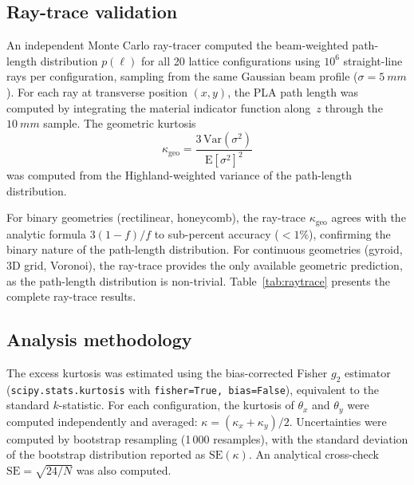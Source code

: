 \documentclass[final,5p,times,twocolumn]{elsarticle}
\begin{document}
\subsection{Ray-trace validation}
\label{sec:raytrace}

An independent Monte Carlo ray-tracer computed the beam-weighted path-length distribution $p(\ell)$ for all 20 lattice configurations using $10^6$ straight-line rays per configuration, sampling from the same Gaussian beam profile ($\sigma=\SI{5}{mm}$).  For each ray at transverse position $(x,y)$, the PLA path length was computed by integrating the material indicator function along~$z$ through the $\SI{10}{mm}$ sample.  The geometric kurtosis
\begin{equation}
  \kappa_{\mathrm{geo}} = \frac{3\,\mathrm{Var}(\sigma^2)}{\mathrm{E}[\sigma^2]^2}
  \label{eq:kgeo_raytrace}
\end{equation}
was computed from the Highland-weighted variance of the path-length distribution.

For binary geometries (rectilinear, honeycomb), the ray-trace $\kappa_{\mathrm{geo}}$ agrees with the analytic formula $3(1-f)/f$ to sub-percent accuracy ($<1\%$), confirming the binary nature of the path-length distribution.  For continuous geometries (gyroid, 3D grid, Voronoi), the ray-trace provides the only available geometric prediction, as the path-length distribution is non-trivial.  Table~\ref{tab:raytrace} presents the complete ray-trace results.

\subsection{Analysis methodology}
\label{sec:analysis}

The excess kurtosis was estimated using the bias-corrected Fisher $g_2$ estimator (\texttt{scipy.stats.kurtosis} with \texttt{fisher=True, bias=False}), equivalent to the standard $k$-statistic.  For each configuration, the kurtosis of $\theta_x$ and $\theta_y$ were computed independently and averaged: $\kappa = (\kappa_x+\kappa_y)/2$.  Uncertainties were computed by bootstrap resampling (1\,000 resamples), with the standard deviation of the bootstrap distribution reported as $\mathrm{SE}(\kappa)$.  An analytical cross-check $\mathrm{SE}=\sqrt{24/N}$ was also computed.
\end{document}
